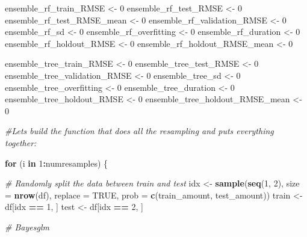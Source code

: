 \documentclass[
]{book}
\newenvironment{Shaded}{\begin{snugshade}}{\end{snugshade}}
\newcommand{\AttributeTok}[1]{\textcolor[rgb]{0.13,0.29,0.53}{#1}}
\newcommand{\CommentTok}[1]{\textcolor[rgb]{0.56,0.35,0.01}{\textit{#1}}}
\newcommand{\ConstantTok}[1]{\textcolor[rgb]{0.56,0.35,0.01}{#1}}
\newcommand{\ControlFlowTok}[1]{\textcolor[rgb]{0.13,0.29,0.53}{\textbf{#1}}}
\newcommand{\DecValTok}[1]{\textcolor[rgb]{0.00,0.00,0.81}{#1}}
\newcommand{\FunctionTok}[1]{\textcolor[rgb]{0.13,0.29,0.53}{\textbf{#1}}}
\newcommand{\NormalTok}[1]{#1}
\newcommand{\OtherTok}[1]{\textcolor[rgb]{0.56,0.35,0.01}{#1}}
\newcommand{\SpecialCharTok}[1]{\textcolor[rgb]{0.81,0.36,0.00}{\textbf{#1}}}
\begin{document}
\begin{Shaded}
\begin{Highlighting}[]
\NormalTok{ensemble\_rf\_train\_RMSE }\OtherTok{\textless{}{-}} \DecValTok{0}
\NormalTok{ensemble\_rf\_test\_RMSE }\OtherTok{\textless{}{-}} \DecValTok{0}
\NormalTok{ensemble\_rf\_test\_RMSE\_mean }\OtherTok{\textless{}{-}} \DecValTok{0}
\NormalTok{ensemble\_rf\_validation\_RMSE }\OtherTok{\textless{}{-}} \DecValTok{0}
\NormalTok{ensemble\_rf\_sd }\OtherTok{\textless{}{-}} \DecValTok{0}
\NormalTok{ensemble\_rf\_overfitting }\OtherTok{\textless{}{-}} \DecValTok{0}
\NormalTok{ensemble\_rf\_duration }\OtherTok{\textless{}{-}} \DecValTok{0}
\NormalTok{ensemble\_rf\_holdout\_RMSE }\OtherTok{\textless{}{-}} \DecValTok{0}
\NormalTok{ensemble\_rf\_holdout\_RMSE\_mean }\OtherTok{\textless{}{-}} \DecValTok{0}

\NormalTok{ensemble\_tree\_train\_RMSE }\OtherTok{\textless{}{-}} \DecValTok{0}
\NormalTok{ensemble\_tree\_test\_RMSE }\OtherTok{\textless{}{-}} \DecValTok{0}
\NormalTok{ensemble\_tree\_validation\_RMSE }\OtherTok{\textless{}{-}} \DecValTok{0}
\NormalTok{ensemble\_tree\_sd }\OtherTok{\textless{}{-}} \DecValTok{0}
\NormalTok{ensemble\_tree\_overfitting }\OtherTok{\textless{}{-}} \DecValTok{0}
\NormalTok{ensemble\_tree\_duration }\OtherTok{\textless{}{-}} \DecValTok{0}
\NormalTok{ensemble\_tree\_holdout\_RMSE }\OtherTok{\textless{}{-}} \DecValTok{0}
\NormalTok{ensemble\_tree\_holdout\_RMSE\_mean }\OtherTok{\textless{}{-}} \DecValTok{0}

\CommentTok{\#Let\textquotesingle{}s build the function that does all the resampling and puts everything together:}

\ControlFlowTok{for}\NormalTok{ (i }\ControlFlowTok{in} \DecValTok{1}\SpecialCharTok{:}\NormalTok{numresamples) \{}

\CommentTok{\# Randomly split the data between train and test}
\NormalTok{idx }\OtherTok{\textless{}{-}} \FunctionTok{sample}\NormalTok{(}\FunctionTok{seq}\NormalTok{(}\DecValTok{1}\NormalTok{, }\DecValTok{2}\NormalTok{), }\AttributeTok{size =} \FunctionTok{nrow}\NormalTok{(df), }\AttributeTok{replace =} \ConstantTok{TRUE}\NormalTok{, }\AttributeTok{prob =} \FunctionTok{c}\NormalTok{(train\_amount, test\_amount))}
\NormalTok{train }\OtherTok{\textless{}{-}}\NormalTok{ df[idx }\SpecialCharTok{==} \DecValTok{1}\NormalTok{, ]}
\NormalTok{test }\OtherTok{\textless{}{-}}\NormalTok{ df[idx }\SpecialCharTok{==} \DecValTok{2}\NormalTok{, ]}

\CommentTok{\# Bayesglm}


\end{Highlighting}
\end{Shaded}
\end{document}
